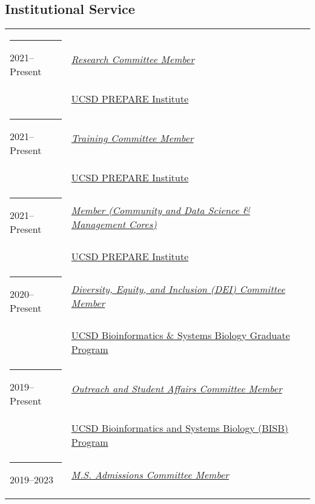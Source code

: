 \documentclass[margin,line]{res}
\begin{document}
\begin{resume}
\section{\sc Institutional Service}
\begin{longtable}{@{}p{0.7in}p{4in}}\rule{-1mm}{4.5mm}
\hspace*{-4mm} 2021--Present & \href{https://prepare.ucsd.edu/cores/}{\textit{Research Committee Member}}\\*
\hspace*{-4mm} & \hspace{4mm} \href{https://prepare.ucsd.edu/}{UCSD PREPARE Institute}\\
\hspace*{-4mm} \rule{-1mm}{5mm} 2021--Present & \href{https://prepare.ucsd.edu/cores/}{\textit{Training Committee Member}}\\*
\hspace*{-4mm} & \hspace{4mm} \href{https://prepare.ucsd.edu/}{UCSD PREPARE Institute}\\
\hspace*{-4mm} \rule{-1mm}{5mm} 2021--Present & \href{https://prepare.ucsd.edu/cores/}{\textit{Member (Community and Data Science \& Management Cores)}}\\*
\hspace*{-4mm} & \hspace{4mm} \href{https://prepare.ucsd.edu/}{UCSD PREPARE Institute}\\
\hspace*{-4mm} \rule{-1mm}{5mm} 2020--Present & \href{https://bioinformatics.ucsd.edu/node/3/}{\textit{Diversity, Equity, and Inclusion (DEI) Committee Member}}\\*
\hspace*{-4mm} & \hspace{4mm} \href{https://bioinformatics.ucsd.edu/}{UCSD Bioinformatics \& Systems Biology Graduate Program}\\
\hspace*{-4mm} \rule{-1mm}{5mm} 2019--Present & \href{https://bioinformatics.ucsd.edu/node/3/}{\textit{Outreach and Student Affairs Committee Member}}\\*
\hspace*{-4mm} & \hspace{4mm} \href{https://bioinformatics.ucsd.edu/}{UCSD Bioinformatics and Systems Biology (BISB) Program}\\
\hspace*{-4mm} \rule{-1mm}{5mm} 2019--2023 & \href{https://cse.ucsd.edu/graduate/degree-programs/ms-program}{\textit{M.S. Admissions Committee Member}}\\*

\end{longtable}
\end{resume}
\end{document}
